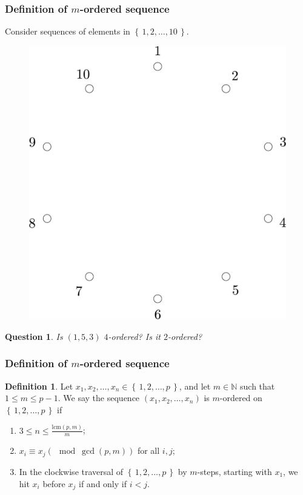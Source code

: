 \documentclass{beamer}
\theoremstyle{plain}
\newtheorem{question}[theorem]{Question}
\theoremstyle{definition}
\newtheorem{Def}[theorem]{Definition}
\theoremstyle{remark}
\newcommand{\n}{\mathbb{N}}				%
\newcommand{\fracc}{\frac}				%
\renewcommand{\leq}{\leqslant}			%
\renewcommand{\'}{\hspace{0.5mm}'}		%
\renewcommand{\Set}[1]{\left\{\,#1\,\right\}}	%
\begin{document}
\begin{frame}
\frametitle{Definition of $m$-ordered sequence}

	Consider sequences of elements in $\Set{1,2,\hdots, 10}$. 

	\begin{figure}
		\includegraphics[scale=0.1]{circ_10.jpg}
	\end{figure}
	
	\begin{question}
		Is $(1,5,3)$ $4$-ordered? Is it $2$-ordered?
	\end{question}
	
\end{frame}


\begin{frame}
\frametitle{Definition of $m$-ordered sequence}
	\begin{Def}
	Let $x_1,x_2,\hdots, x_n \in \Set{1,2,\hdots, p}$, 
	and let $m \in \n$
	such that $1 \leq m \leq p - 1$. We say the 
	sequence $(x_1,x_2,\hdots, x_n)$ is $m$-ordered
	on $\Set{1,2,\hdots, p}$ if 
	\begin{enumerate}
		\item $3 \leq n \leq \fracc{\mathrm{lcm}(p,m)}{m}$;
		\item $x_i \equiv x_j (\mod \gcd(p,m))$ for all
		$i,j$;
		\item In the clockwise traversal of 
		$\Set{1,2,\hdots, p}$ by
		$m$-steps, starting with $x_1$, we hit $x_i$ before
		$x_j$ if and only if $i < j$. 
	\end{enumerate}
	\end{Def}	

\end{frame}
\end{document}
